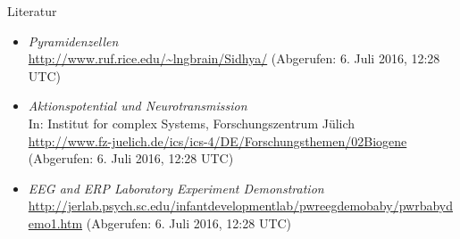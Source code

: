 \documentclass{beamer}
\begin{document}
	\begin{frame}{Literatur}
		\begin{itemize}
			\item \textit{Pyramidenzellen}\\{\footnotesize \url{http://www.ruf.rice.edu/~lngbrain/Sidhya/}}  {\tiny(Abgerufen: 6. Juli 2016, 12:28 UTC)}	
			\item \textit{Aktionspotential und Neurotransmission}\\{\small In: Institut for complex Systems, Forschungszentrum Jülich}\\{\footnotesize \url{http://www.fz-juelich.de/ics/ics-4/DE/Forschungsthemen/02Biogene}}  {\tiny(Abgerufen: 6. Juli 2016, 12:28 UTC)}
			\item \textit{EEG and ERP Laboratory Experiment Demonstration}\\{\footnotesize \url{http://jerlab.psych.sc.edu/infantdevelopmentlab/pwreegdemobaby/pwrbabydemo1.htm}}  {\tiny(Abgerufen: 6. Juli 2016, 12:28 UTC)}
		\end{itemize}
	\end{frame}
\end{document}

